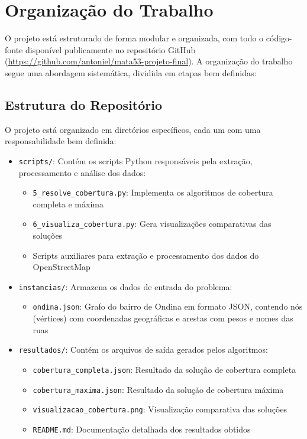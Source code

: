 \documentclass[12pt, a4paper]{report}
\begin{document}
\section{Organização do Trabalho}
O projeto está estruturado de forma modular e organizada, com todo o código-fonte disponível publicamente no repositório GitHub (\url{https://github.com/antoniel/mata53-projeto-final}). A organização do trabalho segue uma abordagem sistemática, dividida em etapas bem definidas:

\subsection{Estrutura do Repositório}
O projeto está organizado em diretórios específicos, cada um com uma responsabilidade bem definida:
\begin{itemize}
    \item \texttt{scripts/}: Contém os scripts Python responsáveis pela extração, processamento e análise dos dados:
    \begin{itemize}
        \item \texttt{5\_resolve\_cobertura.py}: Implementa os algoritmos de cobertura completa e máxima
        \item \texttt{6\_visualiza\_cobertura.py}: Gera visualizações comparativas das soluções
        \item Scripts auxiliares para extração e processamento dos dados do OpenStreetMap
    \end{itemize}
    
    \item \texttt{instancias/}: Armazena os dados de entrada do problema:
    \begin{itemize}
        \item \texttt{ondina.json}: Grafo do bairro de Ondina em formato JSON, contendo nós (vértices) com coordenadas geográficas e arestas com pesos e nomes das ruas
    \end{itemize}
    
    \item \texttt{resultados/}: Contém os arquivos de saída gerados pelos algoritmos:
    \begin{itemize}
        \item \texttt{cobertura\_completa.json}: Resultado da solução de cobertura completa
        \item \texttt{cobertura\_maxima.json}: Resultado da solução de cobertura máxima
        \item \texttt{visualizacao\_cobertura.png}: Visualização comparativa das soluções
        \item \texttt{README.md}: Documentação detalhada dos resultados obtidos
    \end{itemize}
\end{itemize}
\end{document}
